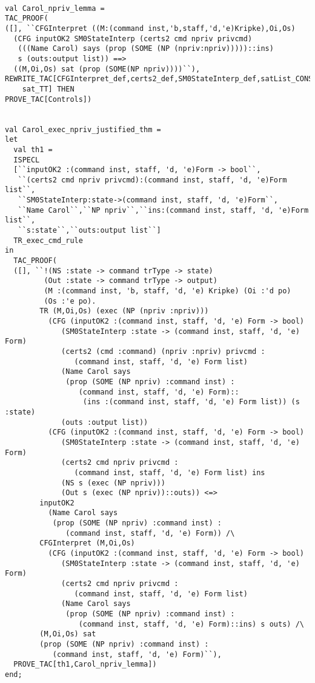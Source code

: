 \documentclass{article}
\begin{document}
\begin{verbatim}

val Carol_npriv_lemma =
TAC_PROOF(
([], ``CFGInterpret ((M:(command inst,'b,staff,'d,'e)Kripke),Oi,Os)
  (CFG inputOK2 SM0StateInterp (certs2 cmd npriv privcmd)
   (((Name Carol) says (prop (SOME (NP (npriv:npriv)))))::ins)
   s (outs:output list)) ==>
  ((M,Oi,Os) sat (prop (SOME(NP npriv))))``),
REWRITE_TAC[CFGInterpret_def,certs2_def,SM0StateInterp_def,satList_CONS,satList_nil,
	sat_TT] THEN
PROVE_TAC[Controls])


val Carol_exec_npriv_justified_thm =
let
  val th1 =
  ISPECL
  [``inputOK2 :(command inst, staff, 'd, 'e)Form -> bool``,
   ``(certs2 cmd npriv privcmd):(command inst, staff, 'd, 'e)Form list``,
   ``SM0StateInterp:state->(command inst, staff, 'd, 'e)Form``,
   ``Name Carol``,``NP npriv``,``ins:(command inst, staff, 'd, 'e)Form list``,
   ``s:state``,``outs:output list``]
  TR_exec_cmd_rule
in
  TAC_PROOF(
  ([], ``!(NS :state -> command trType -> state)
         (Out :state -> command trType -> output)
         (M :(command inst, 'b, staff, 'd, 'e) Kripke) (Oi :'d po)
         (Os :'e po).
        TR (M,Oi,Os) (exec (NP (npriv :npriv)))
          (CFG (inputOK2 :(command inst, staff, 'd, 'e) Form -> bool)
             (SM0StateInterp :state -> (command inst, staff, 'd, 'e) Form)
             (certs2 (cmd :command) (npriv :npriv) privcmd :
                (command inst, staff, 'd, 'e) Form list)
             (Name Carol says
              (prop (SOME (NP npriv) :command inst) :
                 (command inst, staff, 'd, 'e) Form)::
                  (ins :(command inst, staff, 'd, 'e) Form list)) (s :state)
             (outs :output list))
          (CFG (inputOK2 :(command inst, staff, 'd, 'e) Form -> bool)
             (SM0StateInterp :state -> (command inst, staff, 'd, 'e) Form)
             (certs2 cmd npriv privcmd :
                (command inst, staff, 'd, 'e) Form list) ins
             (NS s (exec (NP npriv)))
             (Out s (exec (NP npriv))::outs)) <=>
        inputOK2
          (Name Carol says
           (prop (SOME (NP npriv) :command inst) :
              (command inst, staff, 'd, 'e) Form)) /\
        CFGInterpret (M,Oi,Os)
          (CFG (inputOK2 :(command inst, staff, 'd, 'e) Form -> bool)
             (SM0StateInterp :state -> (command inst, staff, 'd, 'e) Form)
             (certs2 cmd npriv privcmd :
                (command inst, staff, 'd, 'e) Form list)
             (Name Carol says
              (prop (SOME (NP npriv) :command inst) :
                 (command inst, staff, 'd, 'e) Form)::ins) s outs) /\
        (M,Oi,Os) sat
        (prop (SOME (NP npriv) :command inst) :
           (command inst, staff, 'd, 'e) Form)``),
  PROVE_TAC[th1,Carol_npriv_lemma])
end;



\end{verbatim}
\end{document}
